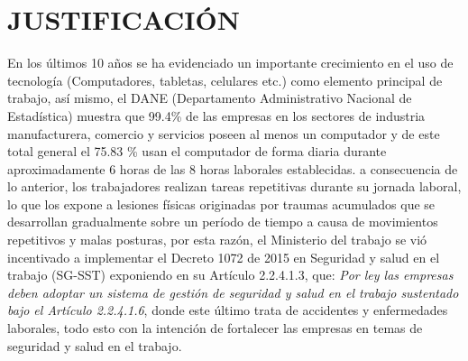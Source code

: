 \chapter{JUSTIFICACIÓN}
En los últimos 10 años se ha evidenciado un importante crecimiento en el uso de tecnología (Computadores, tabletas, celulares etc.) como elemento principal de trabajo, así mismo, el DANE (Departamento Administrativo Nacional de Estadística)  muestra que 99.4\% de las empresas en los sectores de industria manufacturera, comercio y servicios poseen al menos un computador y de este total general el 75.83 \% usan el computador de forma diaria durante aproximadamente 6 horas de las 8 horas laborales establecidas.\parencite[]{Dane2013IndicadoresEmpresas} a consecuencia de lo anterior, los trabajadores realizan tareas repetitivas durante su jornada laboral, lo que los expone a lesiones físicas originadas por traumas acumulados que se desarrollan gradualmente sobre un período de tiempo a causa de movimientos repetitivos y malas posturas, por esta razón, el Ministerio del trabajo se vió incentivado a implementar el Decreto 1072 de 2015 en Seguridad y salud en el trabajo (SG-SST) exponiendo en su Artículo 2.2.4.1.3, que: \textit{Por ley las empresas deben adoptar un sistema de gestión de seguridad y salud en el trabajo sustentado bajo el Artículo 2.2.4.1.6}, donde este último trata de accidentes y enfermedades laborales, todo esto con la intención de fortalecer las empresas en temas de seguridad y salud en el trabajo.  


